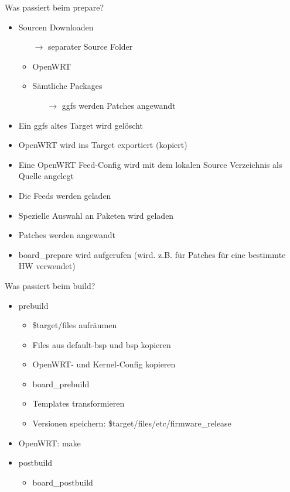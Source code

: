 \begin{frame}{Was passiert beim prepare?}
    \begin{itemize}
        \item Sourcen Downloaden
        \begin{itemize}
            \item[$\rightarrow$] separater Source Folder
            \item OpenWRT
            \item Sämtliche Packages
            \begin{itemize}
                \item[$\rightarrow$] ggfs werden Patches angewandt
            \end{itemize}
        \end{itemize}
        \item Ein ggfs altes Target wird gelöscht
        \item OpenWRT wird ins Target exportiert (kopiert)
        \item Eine OpenWRT Feed-Config wird mit dem lokalen Source Verzeichnis als Quelle angelegt
        \item Die Feeds werden geladen
        \item Spezielle Auswahl an Paketen wird geladen
        \item Patches werden angewandt
        \item board\_prepare wird aufgerufen (wird. z.B. für Patches für eine bestimmte HW verwendet)
    \end{itemize}
\end{frame}

\begin{frame}{Was passiert beim build?}
    \begin{itemize}
        \item prebuild
        \begin{itemize}
            \item \$target/files aufräumen
            \item Files aus default-bsp und bsp kopieren
            \item OpenWRT- und Kernel-Config kopieren
            \item board\_prebuild
            \item Templates transformieren
            \item Versionen speichern: \$target/files/etc/firmware\_release
        \end{itemize}
        \item OpenWRT: make
        \item postbuild
        \begin{itemize}
            \item board\_postbuild
        \end{itemize}
    \end{itemize}
\end{frame}

